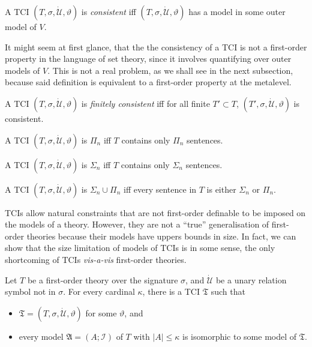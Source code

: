 \documentclass[12pt]{article}
\numberwithin{equation}{section}
\begin{document}
\begin{defi}
A TCI $(T, \sigma, \dot{\mathcal{U}}, \vartheta)$ is \emph{consistent} iff $(T, \sigma, \dot{\mathcal{U}}, \vartheta)$ has a model in some outer model of $V$. 
\end{defi}

\begin{rem}\label{promise}
It might seem at first glance, that the the consistency of a TCI is not a first-order property in the language of set theory, since it involves quantifying over outer models of $V$. This is not a real problem, as we shall see in the next subsection, because said definition is equivalent to a first-order property at the metalevel.
\end{rem}

\begin{defi}
A TCI $(T, \sigma, \dot{\mathcal{U}}, \vartheta)$ is \emph{finitely consistent} iff for all finite $T' \subset T$, $(T', \sigma, \dot{\mathcal{U}}, \vartheta)$ is consistent. 
\end{defi}

\begin{defi}
A TCI $(T, \sigma, \dot{\mathcal{U}}, \vartheta)$ is $\Pi_n$ iff $T$ contains only $\Pi_n$ sentences.

A TCI $(T, \sigma, \dot{\mathcal{U}}, \vartheta)$ is $\Sigma_n$ iff $T$ contains only $\Sigma_n$ sentences.

A TCI $(T, \sigma, \dot{\mathcal{U}}, \vartheta)$ is $\Sigma_n \cup \Pi_n$ iff every sentence in $T$ is either $\Sigma_n$ or $\Pi_n$.
\end{defi}

TCIs allow natural constraints that are not first-order definable to be imposed on the models of a theory. However, they are not a ``true'' generalisation of first-order theories because their models have uppers bounds in size. In fact, we can show that the size limitation of models of TCIs is in some sense, the only shortcoming of TCIs \emph{vis-a-vis} first-order theories. 

\begin{lem}
Let $T$ be a first-order theory over the signature $\sigma$, and $\dot{\mathcal{U}}$ be a unary relation symbol not in $\sigma$. For every cardinal $\kappa$, there is a TCI $\mathfrak{T}$ such that 
\begin{itemize}
    \item $\mathfrak{T} = (T, \sigma, \dot{\mathcal{U}}, \vartheta)$ for some $\vartheta$, and
    \item every model $\mathfrak{A} = (A; \mathcal{I})$ of $T$ with $|A| \leq \kappa$ is isomorphic to some model of $\mathfrak{T}$.
\end{itemize}
\end{lem}
\end{document}
